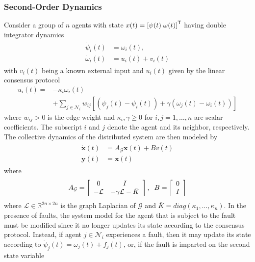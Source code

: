 \documentclass[letterpaper, 10 pt, conference]{ieeeconf}  %
\def\R{\mathbb{R}}
\def\tT{\mathsf{T}} %
\def\cG{\mathcal{G}}
\def\cL{\mathcal{L}}
\begin{document}
\subsubsection{Second-Order Dynamics}
Consider a group of $n$ agents with state $x(t)=\left [\psi(t) \hspace{1mm} \omega (t) \right]^{\tT}$ having double integrator dynamics 
\begin{gather} \label{eq:doubleInt}
\begin{aligned}
\dot{\psi}_i(t) &= \omega_i(t), \\
\dot{\omega}_i(t) &= u_i(t) + v_i(t) \nonumber
\end{aligned}
\end{gather}
with $v_i(t)$ being a known external input and $u_i(t)$ given by the linear consensus protocol 
\begin{align}
u_i(t) = & -\kappa_i \omega_i(t) \nonumber \\
		 &  +\sum_{j \in \mathcal{N}_i} w_{ij} \left [ (\psi_j(t) - \psi_i(t)) + \gamma (\omega_j(t) - \omega_i(t)) \right ] \nonumber
\end{align}
where $w_{ij} > 0$ is the edge weight and $\kappa_i, \gamma \geq 0$ for $i, j = 1, \ldots, n$ are scalar coefficients.  The subscript $i$ and $j$ denote the agent and its neighbor, respectively.  The collective dynamics of the distributed system are then modeled by \cite{ren_distributed_2007,teixeira_toward_2014}
\begin{gather}  \label{eq:doubleCons}
\begin{aligned}
\dot{\mathbf{x}}(t) &= A_{\cG} \mathbf{x}(t) + Bv(t) \\
\mathbf{y}(t) &= \mathbf{x}(t)
\end{aligned}
\end{gather}
where 
\begin{align} \label{eq:AB}
A_{\cG} = \left [\begin{array}{cc}
0 & I \\
-\cL & -\gamma \cL -\bar{K}
\end{array} \right ], \hspace{2mm} B = \left [ \begin{array}{c} 0 \\ I \end{array} \right]
\end{align}
where $\cL \in \R^{2n \times 2n}$ is the graph Laplacian of $\cG$ and $\bar{K} = diag(\kappa_1, \ldots, \kappa_n)$. In the presence of faults, the system model for the agent that is subject to the fault must be modified since it no longer updates its state according to the consensus protocol. Instead, if agent $j \in \mathcal{N}_i$ experiences a fault, then it may update its state according to $\dot{\psi}_j(t) = \omega_j (t) + f_j (t)$, or, if the fault is imparted on the second state variable 
\end{document}
